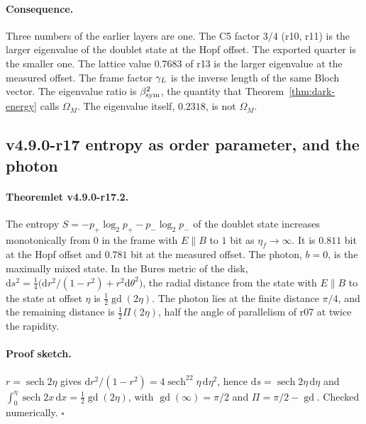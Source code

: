 \paragraph{Consequence.}
Three numbers of the earlier layers are one.  The C5 factor \(3/4\) (r10, r11) is the larger eigenvalue of the doublet state at
the Hopf offset.  The exported quarter is the smaller one.  The lattice value \(0.7683\) of r13 is the larger eigenvalue at the
measured offset.  The frame factor \(\gamma_L\) is the inverse length of the same Bloch vector.  The eigenvalue ratio is \(\beta_{\mathrm{sym}}^2\), the
quantity that Theorem~\ref{thm:dark-energy} calls \(\Omega_M\).  The eigenvalue itself, \(0.2318\), is not \(\Omega_M\).

\subsection*{v4.9.0-r17 entropy as order parameter, and the photon}
\label{subsec:v490-r17-entropy}

\paragraph{Theoremlet v4.9.0-r17.2.}
The entropy \(S=-p_+\log_2p_+-p_-\log_2p_-\) of the doublet state increases monotonically from \(0\) in the frame with
\(E\parallel B\) to \(1\) bit as \(\eta_f\to\infty\).  It is \(0.811\) bit at the Hopf offset and \(0.781\) bit at the measured
offset.  The photon, \(b=0\), is the maximally mixed state.  In the Bures metric of the disk,
\(\mathrm ds^2=\tfrac14\bigl(\mathrm dr^2/(1-r^2)+r^2\mathrm d\theta^2\bigr)\), the radial distance from the state with \(E\parallel B\)
to the state at offset \(\eta\) is \(\tfrac12\operatorname{gd}(2\eta)\).  The photon lies at the finite distance \(\pi/4\), and the remaining
distance is \(\tfrac12\Pi(2\eta)\), half the angle of parallelism of r07 at twice the rapidity.

\paragraph{Proof sketch.}
\(r=\operatorname{sech}2\eta\) gives \(\mathrm dr^2/(1-r^2)=4\operatorname{sech}^22\eta\,\mathrm d\eta^2\), hence \(\mathrm ds=\operatorname{sech}2\eta\,\mathrm d\eta\)
and \(\int_0^\eta\operatorname{sech}2x\,\mathrm dx=\tfrac12\operatorname{gd}(2\eta)\), with \(\operatorname{gd}(\infty)=\pi/2\) and
\(\Pi=\pi/2-\operatorname{gd}\).  Checked numerically.  \(\square\)


